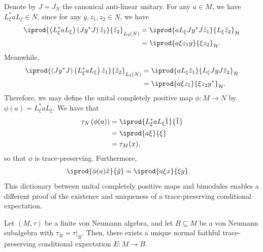 \documentclass[10pt]{mypackage}
\begin{document}
Denote by $J = J_N$ the canonical anti-linear unitary. For any $a\in M$, we have $L_{\xi}^{\ast}aL_{\xi}\in N$, since for any $y,z_1,z_2\in N$, we have
\begin{align*}
  \iprod{\left( L_{\xi}^{\ast}aL_{\xi} \right)\left( Jy^{\ast}J \right)\hat{z}_1}{\hat{z}_2}_{L_2(N)} &= \iprod{aL_{\xi}Jy^{\ast}J \hat{z}_1}{ L_{\xi}\hat{z}_2 }_{\mathcal{H}}\\
                                                                                             &= \iprod{a\xi z_1 y}{\xi z_2}_{\mathcal{H}}.
\end{align*}
Meanwhile,
\begin{align*}
  \iprod{\left( Jy^{\ast}J \right)\left( L_{\xi}^{\ast}aL_{\xi} \right)\hat{z}_1}{\hat{z}_2}_{L_2(N)} &= \iprod{aL_{\xi}\hat{z}_1}{L_{\xi}JyJ\hat{z}_2}_{\mathcal{H}}\\
                                                                                                      &= \iprod{a\xi z_1}{\xi z_2 y^{\ast}}_{\mathcal{H}}.
\end{align*}
Therefore, we may define the unital completely positive map $\phi\colon M\rightarrow N$ by $\phi(a) = L_{\xi}^{\ast}aL_{\xi}$. We have that
\begin{align*}
  \tau_N\left( \phi(a) \right) &= \iprod{L_{\xi}^{\ast}aL_{\xi}\hat{1}}{\hat{1}}\\
                               &= \iprod{a\xi}{\xi}\\
                               &= \tau_M(x),
\end{align*}
so that $\phi$ is trace-preserving. Furthermore,
\begin{align*}
  \iprod{\phi(a)\hat{x}}{\hat{y}} &= \iprod{a\xi x}{\xi y}.
\end{align*}
This dictionary between unital completely positive maps and bimodules enables a different proof of the existence and uniqueness of a trace-preserving conditional expectation.
\begin{proposition}
  Let $\left( M,\tau \right)$ be a finite von Neumann algebra, and let $B\subseteq M$ be a von Neumann subalgebra with $\tau_B = \tau|_{B}$. Then, there exists a unique normal faithful trace-preserving conditional expectation $E\colon M\rightarrow B$.
\end{proposition}
\end{document}
